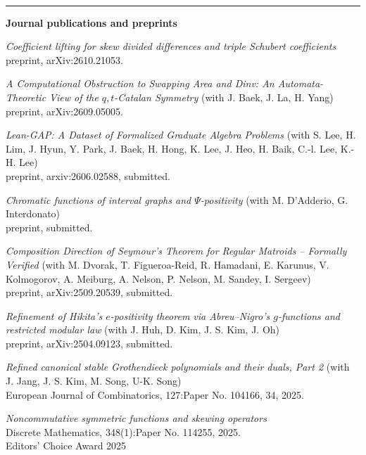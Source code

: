 \documentclass[letterpaper,11pt]{article}
\newcommand{\resheading}[1]{
	\vspace{5pt}
	\textbf{\sffamily{\mbox{~}\makebox[6.762in][l]{\large #1} \vphantom{p\^{E}}}} \\[-6pt]
	\par\noindent\rule{\textwidth}{0.4pt}
}
\begin{document}
\vspace{1cm}
\resheading{Publications}
{\bf Journal publications and preprints}
\begin{etaremune}
    \item \emph{Coefficient lifting for skew divided differences and triple Schubert coefficients} \\
    preprint, arXiv:2610.21053.

    \item \emph{A Computational Obstruction to Swapping Area and Dinv: An Automata-Theoretic View of the $q,t$-Catalan Symmetry} (with J. Baek, J. La, H. Yang) \\
    preprint, arXiv:2609.05005.

    \item \emph{Lean-GAP: A Dataset of Formalized Graduate Algebra Problems} (with S. Lee, H. Lim, J. Hyun, Y. Park, J. Baek, H. Hong, K. Lee, J. Heo, H. Baik, C.-l. Lee, K.-H. Lee) \\
    preprint, arxiv:2606.02588, submitted.

    \item \emph{Chromatic functions of interval graphs and \( \Psi \)-positivity} (with M. D'Adderio, G. Interdonato) \\
    preprint, submitted.

    \item \emph{Composition Direction of Seymour's Theorem for Regular Matroids -- Formally Verified} (with M. Dvorak, T. Figueroa-Reid, R. Hamadani, E. Karunus, V. Kolmogorov, A. Meiburg, A. Nelson, P. Nelson, M. Sandey, I. Sergeev) \\
    preprint, arXiv:2509.20539, submitted.

    \item \emph{Refinement of Hikita's $e$-positivity theorem via Abreu--Nigro's $g$-functions and restricted modular law} (with J. Huh, D. Kim, J. S. Kim, J. Oh) \\
    preprint, arXiv:2504.09123, submitted.

    \item \emph{Refined canonical stable Grothendieck polynomials and their duals, Part 2} (with J. Jang, J. S. Kim, M. Song, U-K. Song) \\
    European Journal of Combinatorics, 127:Paper No. 104166, 34, 2025.

    \item \emph{Noncommutative symmetric functions and skewing operators} \\
    Discrete Mathematics, 348(1):Paper No. 114255, 2025. \\
    Editors' Choice Award 2025


\end{etaremune}
\end{document}
